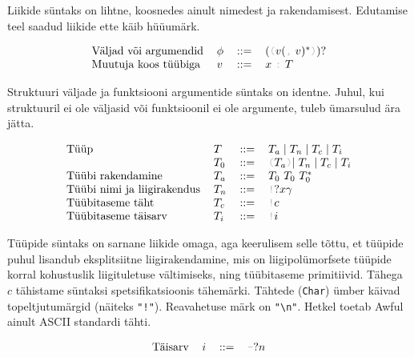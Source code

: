 \documentclass[12pt]{article}
\begin{document}
    Liikide süntaks on lihtne, koosnedes ainult nimedest ja rakendamisest. Edutamise teel saadud liikide ette käib hüüumärk.

    \begin{equation*}
      \begin{tabular}{llll}
        Väljad või argumendid & $\phi$ & $::=$ & $(${\color{helehall}\verb!(!}$v(${\color{helehall}\verb!,!} $v)^*${\color{helehall}\verb!)!}$)?$ \\
        Muutuja koos tüübiga  & $v$    & $::=$ & $x$ {\color{helehall}\verb!:!} $T$
      \end{tabular}
    \end{equation*}

    Struktuuri väljade ja funktsiooni argumentide süntaks on identne. Juhul, kui struktuuril ei ole väljasid või funktsioonil ei ole argumente, tuleb ümarsulud ära jätta.

    \begin{equation*}
      \begin{tabular}{llll}
        Tüüp                        & $T$   & $::=$ & $T_a\mid T_n\mid T_c\mid T_i$ \\
                                    & $T_0$ & $::=$ & {\color{helehall}\verb!(!}$T_a${\color{helehall}\verb!)!}$\mid T_n\mid T_c\mid T_i$ \\
        Tüübi rakendamine           & $T_a$ & $::=$ & $T_0$ $T_0$ $T_0^*$ \\
        Tüübi nimi ja liigirakendus & $T_n$ & $::=$ & {\color{helehall}\verb"!"}$?x\gamma$ \\
        Tüübitaseme täht            & $T_c$ & $::=$ & {\color{helehall}\verb"!"}$c$ \\
        Tüübitaseme täisarv         & $T_i$ & $::=$ & {\color{helehall}\verb"!"}$i$
      \end{tabular}
    \end{equation*}

    Tüüpide süntaks on sarnane liikide omaga, aga keerulisem selle tõttu, et tüüpide puhul lisandub eksplitsiitne liigirakendamine, mis on liigipolümorfsete tüüpide korral kohustuslik liigituletuse vältimiseks, ning tüübitaseme primitiivid. Tähega $c$ tähistame süntaksi spetsifikatsioonis tähemärki. Tähtede (\verb!Char!) ümber käivad topeltjutumärgid (näiteks \verb#"!"#). Reavahetuse märk on \verb!"\n"!. Hetkel toetab Awful ainult ASCII standardi tähti.

    \begin{equation*}
      \begin{tabular}{llll}
        Täisarv & $i$ & $::=$ & {\color{helehall}\verb!-!}$?n$
      \end{tabular}
    \end{equation*}
\end{document}
